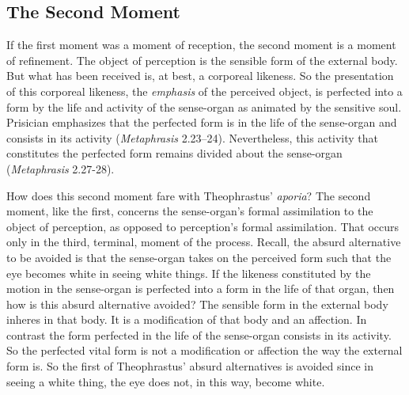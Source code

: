\documentclass[12pt]{article}
\begin{document}

\subsection{The Second Moment} %
\label{sub:the_second_moment}

If the first moment was a moment of reception, the second moment is a moment of refinement. The object of perception is the sensible form of the external body. But what has been received is, at best, a corporeal likeness. So the presentation of this corporeal likeness, the \emph{emphasis} of the perceived object, is perfected into a form by the life and activity of the sense-organ as animated by the sensitive soul. Prisician emphasizes that the perfected form is in the life of the sense-organ and consists in its activity (\emph{Metaphrasis} 2.23--24). Nevertheless, this activity that constitutes the perfected form remains divided about the sense-organ (\emph{Metaphrasis} 2.27-28).

How does this second moment fare with Theophrastus' \emph{aporia}? The second moment, like the first, concerns the sense-organ's formal assimilation to the object of perception, as opposed to perception's formal assimilation. That occurs only in the third, terminal, moment of the process. Recall, the absurd alternative to be avoided is that the sense-organ takes on the perceived form such that the eye becomes white in seeing white things. If the likeness constituted by the motion in the sense-organ is perfected into a form in the life of that organ, then how is this absurd alternative avoided? The sensible form in the external body inheres in that body. It is a modification of that body and an affection. In contrast the form perfected in the life of the sense-organ consists in its activity. So the perfected vital form is not a modification or affection the way the external form is. So the first of Theophrastus' absurd alternatives is avoided since in seeing a white thing, the eye does not, in this way, become white.
\end{document}
